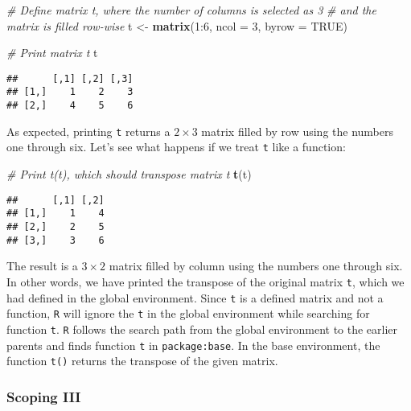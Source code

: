 \documentclass[11,]{article}
\newenvironment{Shaded}{\begin{snugshade}}{\end{snugshade}}
\newcommand{\KeywordTok}[1]{\textcolor[rgb]{0.13,0.29,0.53}{\textbf{{#1}}}}
\newcommand{\DataTypeTok}[1]{\textcolor[rgb]{0.13,0.29,0.53}{{#1}}}
\newcommand{\DecValTok}[1]{\textcolor[rgb]{0.00,0.00,0.81}{{#1}}}
\newcommand{\StringTok}[1]{\textcolor[rgb]{0.31,0.60,0.02}{{#1}}}
\newcommand{\CommentTok}[1]{\textcolor[rgb]{0.56,0.35,0.01}{\textit{{#1}}}}
\newcommand{\OtherTok}[1]{\textcolor[rgb]{0.56,0.35,0.01}{{#1}}}
\newcommand{\NormalTok}[1]{{#1}}
\begin{document}
\begin{Shaded}
\begin{Highlighting}[]
\CommentTok{# Define matrix t, where the number of columns is selected as 3}
\CommentTok{# and the matrix is filled row-wise}
\NormalTok{t <-}\StringTok{ }\KeywordTok{matrix}\NormalTok{(}\DecValTok{1}\NormalTok{:}\DecValTok{6}\NormalTok{, }\DataTypeTok{ncol =} \DecValTok{3}\NormalTok{, }\DataTypeTok{byrow =} \OtherTok{TRUE}\NormalTok{)}

\CommentTok{# Print matrix t}
\NormalTok{t}
\end{Highlighting}
\end{Shaded}

\begin{verbatim}
##      [,1] [,2] [,3]
## [1,]    1    2    3
## [2,]    4    5    6
\end{verbatim}

As expected, printing \texttt{t} returns a \(2\times3\) matrix filled by
row using the numbers one through six. Let's see what happens if we
treat \texttt{t} like a function:

\begin{Shaded}
\begin{Highlighting}[]
\CommentTok{# Print t(t), which should transpose matrix t}
\KeywordTok{t}\NormalTok{(t)}
\end{Highlighting}
\end{Shaded}

\begin{verbatim}
##      [,1] [,2]
## [1,]    1    4
## [2,]    2    5
## [3,]    3    6
\end{verbatim}

The result is a \(3\times2\) matrix filled by column using the numbers
one through six. In other words, we have printed the transpose of the
original matrix \texttt{t}, which we had defined in the global
environment. Since \texttt{t} is a defined matrix and not a function,
\texttt{R} will ignore the \texttt{t} in the global environment while
searching for function \texttt{t}. \texttt{R} follows the search path
from the global environment to the earlier parents and finds function
\texttt{t} in \texttt{package:base}. In the base environment, the
function \texttt{t()} returns the transpose of the given matrix.

\subsubsection{Scoping III}\label{scoping-iii}
\end{document}
